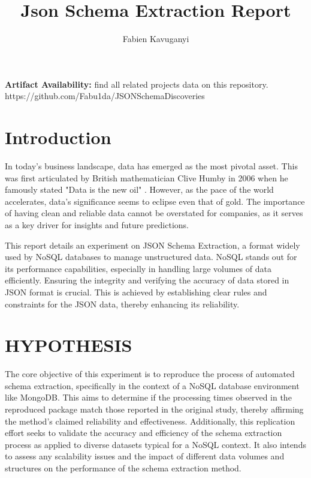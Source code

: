 \documentclass[sigconf, nonacm]{acmart}
\begin{document}
\title{Json Schema Extraction Report}

\author{Fabien Kavuganyi}



\maketitle


\textbf{Artifact Availability:}\newline
find all related projects data on this repository.\newline
https://github.com/Fabu1da/JSONSchemaDiscoveries

\section{Introduction}

In today’s business landscape, data has emerged as the most pivotal asset. This was first articulated by British mathematician Clive Humby in 2006 when he famously stated "Data is the new oil" \cite{fi15020071}. However, as the pace of the world accelerates, data’s significance seems to eclipse even that of gold. The importance of having clean and reliable data cannot be overstated for companies, as it serves as a key driver for insights and future predictions\cite{lee2021survey}.

This report details an experiment on JSON Schema Extraction\cite{keiser2023ondemand}, a format widely used by NoSQL databases to manage unstructured data. NoSQL stands out for its performance capabilities, especially in handling large volumes of data efficiently. Ensuring the integrity and verifying the accuracy of data stored in JSON format is crucial. This is achieved by establishing clear rules and constraints for the JSON data, thereby enhancing its reliability. 


\section{HYPOTHESIS }

The core objective of this experiment is to reproduce the process of automated schema extraction, specifically in the context of a NoSQL database environment like MongoDB. This aims to determine if the processing times observed in the reproduced package match those reported in the original study, thereby affirming the method's claimed reliability and effectiveness. Additionally, this replication effort seeks to validate the accuracy and efficiency of the schema extraction process as applied to diverse datasets typical for a NoSQL context. It also intends to assess any scalability issues and the impact of different data volumes and structures on the performance of the schema extraction method. \cite{8424731}
\end{document}
